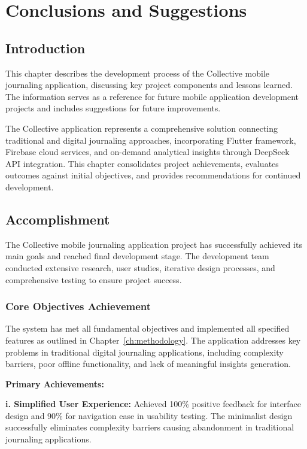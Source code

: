 \chapter{Conclusions and Suggestions}\label{ch:conclusions}

\section{Introduction}\label{sec:conclusionsIntroduction}

This chapter describes the development process of the Collective mobile journaling application, discussing key project components and lessons learned. The information serves as a reference for future mobile application development projects and includes suggestions for future improvements.

The Collective application represents a comprehensive solution connecting traditional and digital journaling approaches, incorporating Flutter framework, Firebase cloud services, and on-demand analytical insights through DeepSeek API integration. This chapter consolidates project achievements, evaluates outcomes against initial objectives, and provides recommendations for continued development.

\section{Accomplishment}\label{sec:accomplishment}

The Collective mobile journaling application project has successfully achieved its main goals and reached final development stage. The development team conducted extensive research, user studies, iterative design processes, and comprehensive testing to ensure project success.

\subsection{Core Objectives Achievement}

The system has met all fundamental objectives and implemented all specified features as outlined in Chapter~\ref{ch:methodology}. The application addresses key problems in traditional digital journaling applications, including complexity barriers, poor offline functionality, and lack of meaningful insights generation.

\textbf{Primary Achievements:}

\textbf{i. Simplified User Experience:} Achieved 100\% positive feedback for interface design and 90\% for navigation ease in usability testing. The minimalist design successfully eliminates complexity barriers causing abandonment in traditional journaling applications.

